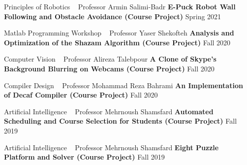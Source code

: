 \begin{cventries}
    \cventry
    {Principles of Robotics ~ Professor Armin Salimi-Badr}
    {\textbf {E-Puck Robot Wall Following and Obstacle Avoidance (Course Project)}}
    {}
    {Spring 2021}
    {}
    \vspace{0.35 cm}
    
    \cventry
    {Matlab Programming Workshop ~ Professor Yaser Shekofteh}
    {\textbf {Analysis and Optimization of the Shazam Algorithm (Course Project)}}
    {}
    {Fall 2020}
    {}
    \vspace{0.35 cm}
    
    \cventry
    {Computer Vision ~ Professor Alireza Talebpour}
    {\textbf {A Clone of Skype's Background Blurring on Webcams (Course Project)}}
    {}
    {Fall 2020}
    {}
    \vspace{0.35 cm}

    \cventry
    {Compiler Design ~ Professor Mohammad Reza Bahrami}
    {\textbf {An Implementation of Decaf Compiler (Course Project)}}
    {}
    {Fall 2020}
    {}
    \vspace{0.35 cm}

    \cventry
    {Artificial Intelligence ~ Professor Mehrnoush Shamsfard}
    {\textbf {Automated Scheduling and Course Selection for Students (Course Project)}}
    {}
    {Fall 2019}
    {}
    \vspace{0.35 cm}

    \cventry
    {Artificial Intelligence ~ Professor Mehrnoush Shamsfard}
    {\textbf {Eight Puzzle Platform and Solver (Course Project)}}
    {}
    {Fall 2019}
    {}
    
\end{cventries}